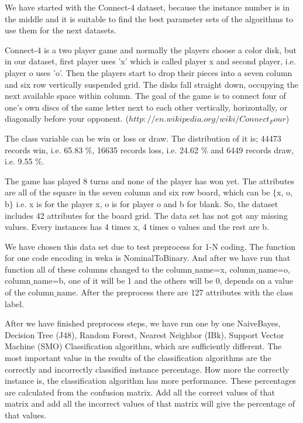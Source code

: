 \documentclass[a4paper]{article}
\begin{document}
We have started with the Connect-4 dataset, because the instance number is in
the middle and it is suitable to find the best parameter sets of the algorithms
to use them for the next datasets.

Connect-4 is a two player game and normally the players choose a color disk,
but in our dataset, first player uses 'x' which is called player x and second
player, i.e. player o uses 'o'. Then the players start to drop their pieces
into a seven column and six row vertically suspended grid. The disks fall
straight down, occupying the next available space within column. The goal of
the game is to connect four of one's own discs of the same letter next to each
other vertically, horizontally, or diagonally before your opponent.
($http://en.wikipedia.org/wiki/Connect_Four$) 

The class variable can be win or loss or draw. The distribution of it is; 44473
records win, i.e. 65.83 $\%$, 16635 records loss,  i.e. 24.62 $\%$ and 6449
records draw,  i.e. 9.55 $\%$.

The game has played 8 turns and none of the player has won yet. The attributes
are all of the square in the seven column and six row board, which can be
$\{$x, o, b$\}$ i.e. x is for the player x, o is for player o and b for blank.
So, the dataset includes 42 attributes for the board grid. The data set has not
got any missing values. Every instances has 4 times x, 4 times o values and the
rest are b. 

We have chosen this data set due to test preprocess for 1-N coding. The
function for one code encoding in weka is NominalToBinary. And after we have
run that function all of these columns changed to the column$\_$name=x,
column$\_$name=o, column$\_$name=b, one of it will be 1 and the others will be
0, depends on a value of the column$\_$name. After the preprocess there are 127
attributes with the class label. 

After we have finished preprocess steps, we have run one by one NaiveBayes,
Decision Tree (J48), Random Forest, Nearest Neighbor (IBk), Support Vector
Machine (SMO) Classification algorithm, which are sufficiently different. The
most important value in the results of the classification algorithms are the
correctly and incorrectly classified instance percentage. How more the
correctly instance is, the classification algorithm has more performance. These
percentages are calculated from the confusion matrix. Add all the correct
values of that matrix and add all the incorrect values of that matrix will give
the percentage of that values. 
\end{document}
